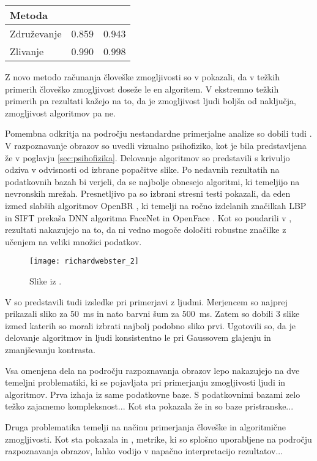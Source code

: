 \begin{table}[!htbp]
	\centering
	\begin{tabular}{l S[table-format=1.3, round-mode=places, round-precision=2] S[table-format=1.3, round-mode=places, round-precision=2]}
		\toprule
		\textbf{Metoda} &  &  \\
		\midrule
		Združevanje & 0.859 & 0.943 \\
		Zlivanje & 0.990 & 0.998 \\
		\bottomrule
	\end{tabular}
	\caption{}
	\label{tab:phillips_pasc}
\end{table}

Z novo metodo računanja človeške zmogljivosti so v \cite{phillips2015human} pokazali, da v težkih primerih človeško zmogljivost doseže le en algoritem. V ekstremno težkih primerih pa rezultati kažejo na to, da je zmogljivost ljudi boljša od naključja, zmogljivost algoritmov pa ne.

Pomembna odkritja na področju nestandardne primerjalne analize so dobili tudi \cite{richardwebster2018visual}. V razpoznavanje obrazov so uvedli vizualno psihofiziko, kot je bila predstavljena že v poglavju \ref{sec:psihofizika}. Delovanje algoritmov so predstavili s krivuljo odziva v odvisnosti od izbrane popačitve slike. Po nedavnih rezultatih na podatkovnih bazah bi verjeli, da se najbolje obnesejo algoritmi, ki temeljijo na nevronskih mrežah. Presnetljivo pa so izbrani stresni testi pokazali, da eden izmed slabših algoritmov OpenBR \cite{a}, ki temelji na ročno izdelanih značilkah LBP \cite{a} in SIFT \cite{a} prekaša DNN algoritma FaceNet \cite{a} in OpenFace \cite{a}. Kot so poudarili v \cite{richardwebster2018visual}, rezultati nakazujejo na to, da ni vedno mogoče določiti robustne značilke z učenjem na veliki množici podatkov.


\begin{figure}[!htbp]
	\centering
	\texttt{[image: richardwebster\_2]}
	\caption{Slike iz \cite{jain2010fddb}.}
\end{figure}


V \cite{richardwebster2018visual} so predstavili tudi izsledke pri primerjavi z ljudmi. Merjencem so najprej prikazali sliko za \SI{50}{\ms} in nato barvni šum za \SI{500}{\ms}. Zatem so dobili $3$ slike izmed katerih so morali izbrati najbolj podobno sliko prvi. Ugotovili so, da je delovanje algoritmov in ljudi konsistentno le pri Gaussovem glajenju in zmanjševanju kontrasta. 

Vsa omenjena dela na področju razpoznavanja obrazov lepo nakazujejo na dve temeljni problematiki, ki se pojavljata pri primerjanju zmogljivosti ljudi in algoritmov. Prva izhaja iz same podatkovne baze. S podatkovnimi bazami zelo težko zajamemo kompleksnost... Kot sta pokazala že \cite{a} in \cite{b} so baze pristranske... 

Druga problematika temelji na načinu primerjanja človeške in algoritmične zmogljivosti. Kot sta pokazala \cite{best2014unconstrained} in \cite{phillips2014comparison}, metrike, ki so splošno uporabljene na področju razpoznavanja obrazov, lahko vodijo v napačno interpretacijo rezultatov... 

